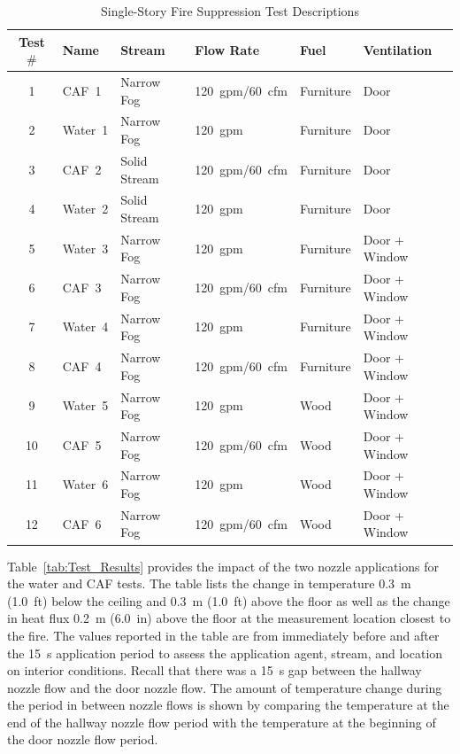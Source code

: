 \documentclass[12pt,oneside]{book}
\begin{document}
\begin{table}[!ht]
\centering
\caption{Single-Story Fire Suppression Test Descriptions}\label{tab:Test_Descriptions}
\begin{tabular}{clllll}
\toprule[1.5pt]
Test $\#$  & Name	& Stream			& Flow Rate		& Fuel           & Ventilation     \\
\midrule
 1 & CAF~1    &  Narrow Fog   &  120~gpm/60~cfm   & Furniture      & Door            \\
 2 & Water~1  &  Narrow Fog  	&  120~gpm    		& Furniture      & Door            \\
 3 & CAF~2    &  Solid Stream       &  120~gpm/60~cfm   & Furniture      & Door            \\
 4 & Water~2  &  Solid Stream       &  120~gpm    		& Furniture      & Door            \\
 5 & Water~3  &  Narrow Fog  	&  120~gpm    		& Furniture      & Door + Window   \\
 6 & CAF~3    &  Narrow Fog   &  120~gpm/60~cfm   & Furniture      & Door + Window   \\
 7 & Water~4  &  Narrow Fog  	&  120~gpm    		& Furniture      & Door + Window   \\
 8 & CAF~4    &  Narrow Fog   &  120~gpm/60~cfm   & Furniture      & Door + Window   \\
 9 & Water~5  &  Narrow Fog  	&  120~gpm   		& Wood           & Door + Window   \\
10 & CAF~5    &  Narrow Fog   &  120~gpm/60~cfm   & Wood           & Door + Window   \\
11 & Water~6  &  Narrow Fog  	&  120~gpm    		& Wood           & Door + Window   \\
12 & CAF~6    &  Narrow Fog   &  120~gpm/60~cfm   & Wood           & Door + Window   \\
\bottomrule[1.25pt]
\end{tabular}\par
\end{table}

Table~\ref{tab:Test_Results} provides the impact of the two nozzle applications for the water and CAF tests. The table lists the change in temperature 0.3~m (1.0~ft) below the ceiling and 0.3~m (1.0~ft) above the floor as well as the change in heat flux 0.2~m (6.0~in) above the floor at the measurement location closest to the fire. The values reported in the table are from immediately before and after the 15~s application period to assess the application agent, stream, and location on interior conditions. Recall that there was a 15~s gap between the hallway nozzle flow and the door nozzle flow. The amount of temperature change during the period in between nozzle flows is shown by comparing the temperature at the end of the hallway nozzle flow period with the temperature at the beginning of the door nozzle flow period.
\end{document}
